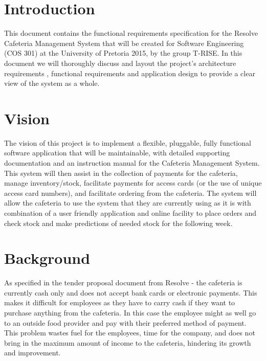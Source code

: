 \documentclass[12pt]{article}
\begin{document}
\maketitle
\break

\tableofcontents
\break


\section{Introduction}
This document contains the functional requirements specification for the Resolve Cafeteria Management System that will be created for Software Engineering (COS 301) at the University of Pretoria 2015, by the group T-RISE. In this document we will thoroughly discuss and layout the project's architecture requirements , functional requirements and application design to provide a clear view of the system as a whole. 

\section{Vision}
The vision of this project is to implement a flexible, pluggable, fully functional software application that will be maintainable, with detailed supporting documentation and an instruction manual for the Cafeteria Management System. This system will then assist in the collection of payments for the cafeteria, manage inventory/stock, facilitate payments for access cards (or the use of unique access card numbers), and facilitate ordering from the cafeteria. The system will allow the cafeteria to use the system that they are currently using as it is with combination of a user friendly application and online facility to place orders and check stock and make predictions of needed stock for the following week.

\section{Background}
As specified in the tender proposal document from Resolve - the cafeteria is currently cash only and does not accept bank cards or electronic payments. This makes it difficult for employees as they have to carry cash if they want to purchase anything from the cafeteria. In this case the employee might as well go to an outside food provider and
pay with their preferred method of payment. This problem wastes fuel for the employees, time for the company, and does not bring in the maximum amount of income to the cafeteria, hindering its growth and improvement.\\
\end{document}
